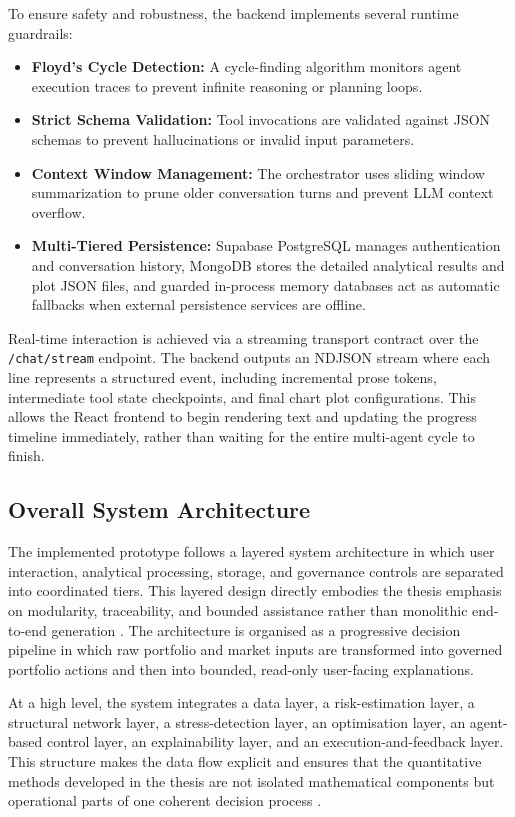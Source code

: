 \documentclass[11pt]{article}
\begin{document}
To ensure safety and robustness, the backend implements several runtime guardrails:
\begin{itemize}
    \item \textbf{Floyd's Cycle Detection:} A cycle-finding algorithm monitors agent execution traces to prevent infinite reasoning or planning loops.
    \item \textbf{Strict Schema Validation:} Tool invocations are validated against JSON schemas to prevent hallucinations or invalid input parameters.
    \item \textbf{Context Window Management:} The orchestrator uses sliding window summarization to prune older conversation turns and prevent LLM context overflow.
    \item \textbf{Multi-Tiered Persistence:} Supabase PostgreSQL manages authentication and conversation history, MongoDB stores the detailed analytical results and plot JSON files, and guarded in-process memory databases act as automatic fallbacks when external persistence services are offline.
\end{itemize}

Real-time interaction is achieved via a streaming transport contract over the \texttt{/chat/stream} endpoint. The backend outputs an NDJSON stream where each line represents a structured event, including incremental prose tokens, intermediate tool state checkpoints, and final chart plot configurations. This allows the React frontend to begin rendering text and updating the progress timeline immediately, rather than waiting for the entire multi-agent cycle to finish.

\subsection{Overall System Architecture}
The implemented prototype follows a layered system architecture in which user interaction, analytical processing, storage, and governance controls are separated into coordinated tiers. This layered design directly embodies the thesis emphasis on modularity, traceability, and bounded assistance rather than monolithic end-to-end generation \cite{jennings1998,wooldridge2009}. The architecture is organised as a progressive decision pipeline in which raw portfolio and market inputs are transformed into governed portfolio actions and then into bounded, read-only user-facing explanations.

At a high level, the system integrates a data layer, a risk-estimation layer, a structural network layer, a stress-detection layer, an optimisation layer, an agent-based control layer, an explainability layer, and an execution-and-feedback layer. This structure makes the data flow explicit and ensures that the quantitative methods developed in the thesis are not isolated mathematical components but operational parts of one coherent decision process \cite{hayesroth1985,adadi2018,wooldridge2009}.
\end{document}
